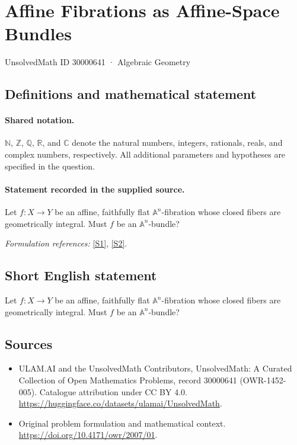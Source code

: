 \documentclass[11pt]{article}
\newcommand{\sref}[2]{\hyperlink{source:#1:#2}{[S#2]}}
\begin{document}
\setcounter{section}{30000640}
\section{Affine Fibrations as Affine-Space Bundles}\label{30000641}
{\small UnsolvedMath ID 30000641 · Algebraic Geometry}
\subsection{Definitions and mathematical statement}

\paragraph{Shared notation.}$\mathbb N$, $\mathbb Z$, $\mathbb Q$, $\mathbb R$, and $\mathbb C$ denote the natural numbers, integers, rationals, reals, and complex numbers, respectively. All additional parameters and hypotheses are specified in the question.


\paragraph{Statement recorded in the supplied source.}
Let $f:X\to Y$ be an affine, faithfully flat $\mathbb{A}^n$-fibration whose closed fibers are geometrically integral. Must $f$ be an $\mathbb{A}^n$-bundle?
\par\smallskip\textit{Formulation references:} \sref{30000641}{1}, \sref{30000641}{2}.
\subsection{Short English statement}
Let $f:X\to Y$ be an affine, faithfully flat $\mathbb{A}^n$-fibration whose closed fibers are geometrically integral. Must $f$ be an $\mathbb{A}^n$-bundle?
\subsection{Sources}
\begin{itemize}
\item[\hypertarget{source:30000641:1}{S1}] ULAM.AI and the UnsolvedMath Contributors, UnsolvedMath: A Curated Collection of Open Mathematics Problems, record 30000641 (OWR-1452-005). Catalogue attribution under CC BY 4.0.
\url{https://huggingface.co/datasets/ulamai/UnsolvedMath}.
\item[\hypertarget{source:30000641:2}{S2}] Original problem formulation and mathematical context.
\url{https://doi.org/10.4171/owr/2007/01}.
\end{itemize}
\label{end:30000641}
\end{document}
